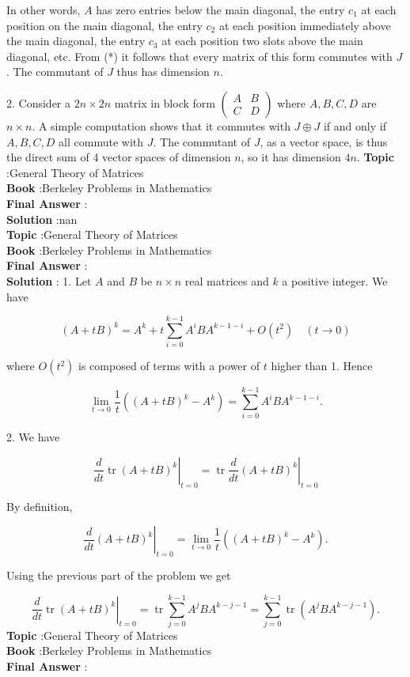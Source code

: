 \documentclass[10pt]{article}
\begin{document}
In other words, $A$ has zero entries below the main diagonal, the entry $c_{1}$ at each position on the main diagonal, the entry $c_{2}$ at each position immediately above the main diagonal, the entry $c_{3}$ at each position two slots above the main diagonal, etc. From (*) it follows that every matrix of this form commutes with $J$. The commutant of $J$ thus has dimension $n$.

2. Consider a $2 n \times 2 n$ matrix in block form $\left(\begin{array}{ll}A & B \\ C & D\end{array}\right)$ where $A, B, C, D$ are $n \times n$. A simple computation shows that it commutes with $J \oplus J$ if and only if $A, B, C, D$ all commute with $J$. The commutant of $J$, as a vector space, is thus the direct sum of 4 vector spaces of dimension $n$, so it has dimension $4 n$.
\textbf{Topic} :General Theory of Matrices \\
\textbf{Book} :Berkeley Problems in Mathematics\\
\textbf{Final Answer} :\\


\textbf{Solution} :nan\\
\textbf{Topic} :General Theory of Matrices \\
\textbf{Book} :Berkeley Problems in Mathematics\\
\textbf{Final Answer} :\\


\textbf{Solution} : 1. Let $A$ and $B$ be $n \times n$ real matrices and $k$ a positive integer. We have

$$
(A+t B)^{k}=A^{k}+t \sum_{i=0}^{k-1} A^{i} B A^{k-1-i}+O\left(t^{2}\right) \quad(t \rightarrow 0)
$$

where $O\left(t^{2}\right)$ is composed of terms with a power of $t$ higher than 1. Hence

$$
\lim _{t \rightarrow 0} \frac{1}{t}\left((A+t B)^{k}-A^{k}\right)=\sum_{i=0}^{k-1} A^{i} B A^{k-1-i} .
$$

2. We have

$$
\left.\frac{d}{d t} \operatorname{tr}(A+t B)^{k}\right|_{t=0}=\left.\operatorname{tr} \frac{d}{d t}(A+t B)^{k}\right|_{t=0}
$$

By definition,

$$
\left.\frac{d}{d t}(A+t B)^{k}\right|_{t=0}=\lim _{t \rightarrow 0} \frac{1}{t}\left((A+t B)^{k}-A^{k}\right) .
$$

Using the previous part of the problem we get

$$
\left.\frac{d}{d t} \operatorname{tr}(A+t B)^{k}\right|_{t=0}=\operatorname{tr} \sum_{j=0}^{k-1} A^{j} B A^{k-j-1}=\sum_{j=0}^{k-1} \operatorname{tr}\left(A^{j} B A^{k-j-1}\right) .
$$
\textbf{Topic} :General Theory of Matrices \\
\textbf{Book} :Berkeley Problems in Mathematics\\
\textbf{Final Answer} :\\
\end{document}
